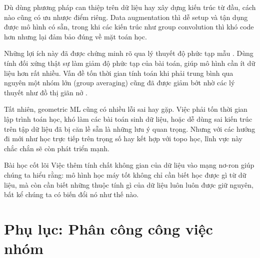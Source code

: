 Dù dùng phương pháp can thiệp trên dữ liệu hay xây dựng kiến trúc từ đầu, cách nào cũng có ưu nhược điểm riêng. Data augmentation thì dễ setup và tận dụng được mô hình có sẵn, trong khi các kiến trúc như group convolution thì khó code hơn nhưng lại đảm bảo đúng về mặt toán học.

Những lợi ích này đã được chứng minh rõ qua lý thuyết độ phức tạp mẫu \cite{tahmasebi2023exact}. Dùng tính đối xứng thật sự làm giảm độ phức tạp của bài toán, giúp mô hình cần ít dữ liệu hơn rất nhiều. Vấn đề tốn thời gian tính toán khi phải trung bình qua nguyên một nhóm lớn (group averaging) cũng đã được giảm bớt nhờ các lý thuyết như đồ thị giãn nở \cite{soleymani2025icml}. 

Tất nhiên, geometric ML cũng có nhiều lỗi sai hay gặp. Việc phải tốn thời gian lập trình toán học, khó làm các bài toán sinh dữ liệu, hoặc dễ dùng sai kiến trúc trên tập dữ liệu đã bị căn lề sẵn là những lưu ý quan trọng. Nhưng với các hướng đi mới như học trực tiếp trên trọng số hay kết hợp với topo học, lĩnh vực này chắc chắn sẽ còn phát triển mạnh.

\begin{infobox}{Bài học cốt lõi}
Việc thêm tính chất không gian của dữ liệu vào mạng nơ-ron giúp chúng ta hiểu rằng: mô hình học máy tốt không chỉ cần biết học được gì từ dữ liệu, mà còn cần biết những thuộc tính gì của dữ liệu luôn luôn được giữ nguyên, bất kể chúng ta có biến đổi nó như thế nào.
\end{infobox}

\clearpage

\section*{Phụ lục: Phân công công việc nhóm}

\clearpage

